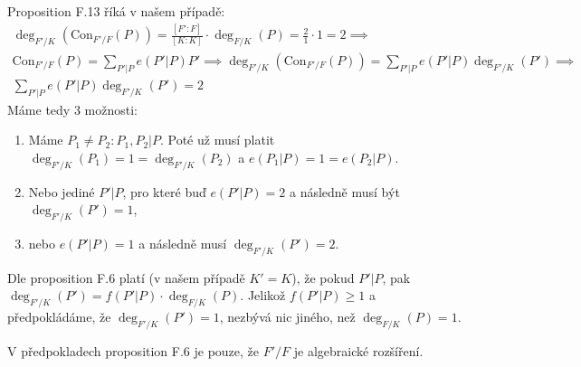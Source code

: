 \documentclass[12pt, a4paper]{article}
\begin{document}
\section{}
Proposition F.13 říká v našem případě:
\begin{gather*}
\deg_{F'/K}(\text{Con}_{F'/F}(P)) = \frac{[F':F]}{[K:K]}\cdot \deg_{F/K}(P) = \frac{2}{1} \cdot 1 = 2 \implies\\
\text{Con}_{F'/F}(P) = \sum\limits_{P'|P}e(P'|P)P' \implies \deg_{F'/K}(\text{Con}_{F'/F}(P)) = \sum\limits_{P'|P}e(P'|P)\deg_{F'/K}(P') \implies\\
\sum\limits_{P'|P}e(P'|P)\deg_{F'/K}(P') = 2
\end{gather*}
Máme tedy 3 možnosti:

\begin{enumerate}
    \item Máme $P_1 \neq P_2: P_1, P_2 | P$. Poté už musí platit $\deg_{F'/K}(P_1)=1=\deg_{F'/K}(P_2)$ a $e(P_1|P)=1=e(P_2|P)$.
    \item Nebo jediné $P' | P$, pro které buď $e(P'|P)=2$ a následně musí být $\deg_{F'/K}(P')=1$,
    \item nebo $e(P'|P)=1$ a následně musí $\deg_{F'/K}(P')=2$.
\end{enumerate}

Dle proposition F.6 platí (v našem případě $K'=K$), že pokud $P'|P$, pak $\deg_{F'/K}(P') = f(P'|P)\cdot \deg_{F/K}(P)$. Jelikož $f(P'|P) \geq 1$ a předpokládáme, že $\deg_{F'/K}(P')=1$, nezbývá nic jiného, než $\deg_{F/K}(P) = 1$.

V předpokladech proposition F.6 je pouze, že $F'/F$ je algebraické rozšíření. 
\end{document}
